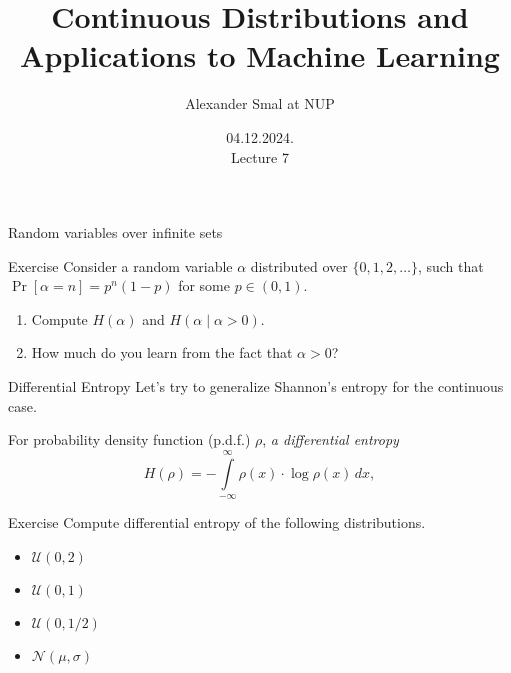 \documentclass[
aspectratio=169]{beamer}
\title{Continuous Distributions and Applications to Machine Learning}
\author{Alexander Smal at NUP}
\date{04.12.2024.\\ Lecture 7}
\begin{document}
\begin{frame}[plain]
    \maketitle
\end{frame}

\begin{frame}{Random variables over infinite sets}
    \begin{block}{Exercise}
         Consider a random variable $\alpha$ distributed over $\{0,1,2,\dotsc\}$,
        such that $\Pr[\alpha = n] = p^n (1-p)$ for some $p\in(0,1)$.
        \begin{enumerate}
            \item Compute $H(\alpha)$ and $H(\alpha\mid \alpha>0)$.
            \item How much do you learn from the fact that $\alpha > 0$?
        \end{enumerate}
    \end{block}
    \vspace{5cm}
\end{frame}



\begin{frame}{Differential Entropy}
Let's try to generalize Shannon's entropy for the continuous case.

For probability density function (p.d.f.) $\rho$, \emph{a differential entropy}
\[
H(\rho) = -\int\limits_{-\infty}^{\infty} \rho(x)\cdot\log \rho(x)\,dx,
\]

\begin{block}{Exercise}
    Compute differential entropy of the following distributions.
    \begin{itemize}
        \item $\mathcal{U}(0,2)$
        \item $\mathcal{U}(0,1)$
        \item $\mathcal{U}(0,1/2)$
        \item $\mathcal{N}(\mu,\sigma)$
    \end{itemize}
\end{block}

\end{frame}
\end{document}
